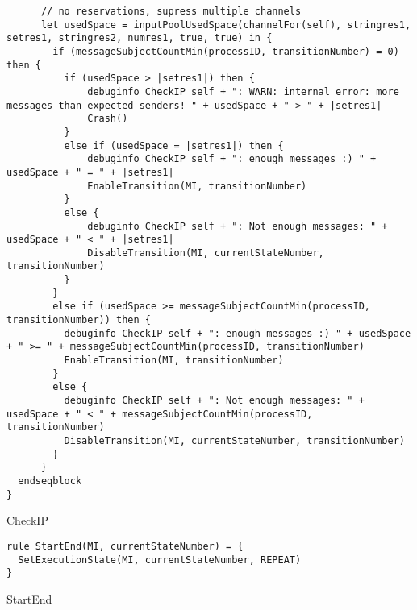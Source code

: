 \begin{listing}[H]
\begin{verbatim}
      // no reservations, supress multiple channels
      let usedSpace = inputPoolUsedSpace(channelFor(self), stringres1, setres1, stringres2, numres1, true, true) in {
        if (messageSubjectCountMin(processID, transitionNumber) = 0) then {
          if (usedSpace > |setres1|) then {
              debuginfo CheckIP self + ": WARN: internal error: more messages than expected senders! " + usedSpace + " > " + |setres1|
              Crash()
          }
          else if (usedSpace = |setres1|) then {
              debuginfo CheckIP self + ": enough messages :) " + usedSpace + " = " + |setres1|
              EnableTransition(MI, transitionNumber)
          }
          else {
              debuginfo CheckIP self + ": Not enough messages: " + usedSpace + " < " + |setres1|
              DisableTransition(MI, currentStateNumber, transitionNumber)
          }
        }
        else if (usedSpace >= messageSubjectCountMin(processID, transitionNumber)) then {
          debuginfo CheckIP self + ": enough messages :) " + usedSpace + " >= " + messageSubjectCountMin(processID, transitionNumber)
          EnableTransition(MI, transitionNumber)
        }
        else {
          debuginfo CheckIP self + ": Not enough messages: " + usedSpace + " < " + messageSubjectCountMin(processID, transitionNumber)
          DisableTransition(MI, currentStateNumber, transitionNumber)
        }
      }
  endseqblock
}
\end{verbatim}
\caption{CheckIP}
\label{lst:asm:CheckIP}
\end{listing}





\begin{listing}[H]
\begin{verbatim}
rule StartEnd(MI, currentStateNumber) = {
  SetExecutionState(MI, currentStateNumber, REPEAT)
}
\end{verbatim}
\caption{StartEnd}
\label{lst:asm:StartEnd}
\end{listing}




